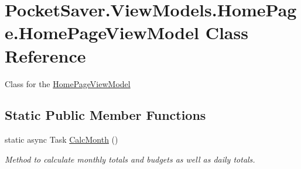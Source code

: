 \hypertarget{class_pocket_saver_1_1_view_models_1_1_home_page_1_1_home_page_view_model}{}\section{Pocket\+Saver.\+View\+Models.\+Home\+Page.\+Home\+Page\+View\+Model Class Reference}
\label{class_pocket_saver_1_1_view_models_1_1_home_page_1_1_home_page_view_model}


Class for the \hyperlink{class_pocket_saver_1_1_view_models_1_1_home_page_1_1_home_page_view_model}{Home\+Page\+View\+Model}  


\subsection*{Static Public Member Functions}
\begin{DoxyCompactItemize}
\item 
static async Task \hyperlink{class_pocket_saver_1_1_view_models_1_1_home_page_1_1_home_page_view_model_a872931bc4313697242a5966ee80a1e1d}{Calc\+Month} ()
\begin{DoxyCompactList}\small\item\em Method to calculate monthly totals and budgets as well as daily totals. \end{DoxyCompactList}\end{DoxyCompactItemize}
